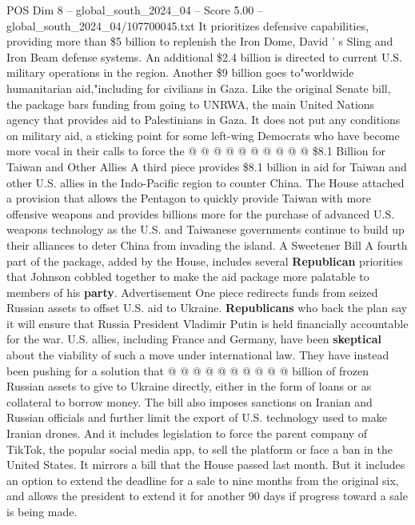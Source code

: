 \begin{textsample}{POS Dim 8 – global\_south\_2024\_04 – Score 5.00 – global\_south\_2024\_04/107700045.txt}
It prioritizes defensive capabilities, providing more than \$5 billion to replenish the Iron Dome, David ' s Sling and Iron Beam defense systems.
An additional \$2.4 billion is directed to current U.S. military operations in the region.
Another \$9 billion goes to"worldwide humanitarian aid,"including for civilians in Gaza.
Like the original Senate bill, the package bars funding from going to UNRWA, the main United Nations agency that provides aid to Palestinians in Gaza.
It does not put any conditions on military aid, a sticking point for some left-wing Democrats who have become more vocal in their calls to force the @ @ @ @ @ @ @ @ @ @ \$8.1 Billion for Taiwan and Other Allies A third piece provides \$8.1 billion in aid for Taiwan and other U.S. allies in the Indo-Pacific region to counter China.
The House attached a provision that allows the Pentagon to quickly provide Taiwan with more offensive weapons and provides billions more for the purchase of advanced U.S. weapons technology as the U.S. and Taiwanese governments continue to build up their alliances to deter China from invading the island.
A Sweetener Bill A fourth part of the package, added by the House, includes several \textbf{Republican} priorities that Johnson cobbled together to make the aid package more palatable to members of his \textbf{party}.
Advertisement One piece redirects funds from seized Russian assets to offset U.S. aid to Ukraine. \textbf{Republicans} who back the plan say it will ensure that Russia President Vladimir Putin is held financially accountable for the war.
U.S. allies, including France and Germany, have been \textbf{skeptical} about the viability of such a move under international law.
They have instead been pushing for a solution that @ @ @ @ @ @ @ @ @ @ billion of frozen Russian assets to give to Ukraine directly, either in the form of loans or as collateral to borrow money.
The bill also imposes sanctions on Iranian and Russian officials and further limit the export of U.S. technology used to make Iranian drones.
And it includes legislation to force the parent company of TikTok, the popular social media app, to sell the platform or face a ban in the United States.
It mirrors a bill that the House passed last month.
But it includes an option to extend the deadline for a sale to nine months from the original six, and allows the president to extend it for another 90 days if progress toward a sale is being made.

\end{textsample}
